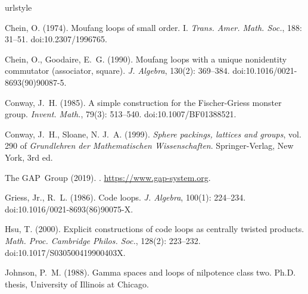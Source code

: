 \documentclass{article}
\theoremstyle{plain}
\theoremstyle{definition}
\begin{document}

\newpage

\begin{thebibliography}{10}
\expandafter\ifx\csname urlstyle\endcsname\relax
 \providecommand{\doi}[1]{doi:\discretionary{}{}{}#1}\else
 \providecommand{\doi}{doi:\discretionary{}{}{}\begingroup
  \urlstyle{rm}\Url}\fi

Chein, O. (1974).
\newblock Moufang loops of small order. {I}.
\newblock \emph{Trans. Amer. Math. Soc.}, 188: 31--51.
\newblock \doi{10.2307/1996765}.

Chein, O., Goodaire, E.~G. (1990).
\newblock Moufang loops with a unique nonidentity commutator (associator,
  square).
\newblock \emph{J. Algebra}, 130(2): 369--384.
\newblock \doi{10.1016/0021-8693(90)90087-5}.

Conway, J.~H. (1985).
\newblock A simple construction for the {F}ischer-{G}riess monster group.
\newblock \emph{Invent. Math.}, 79(3): 513--540.
\newblock \doi{10.1007/BF01388521}.

Conway, J.~H., Sloane, N. J.~A. (1999).
\newblock \emph{Sphere packings, lattices and groups}, vol. 290 of
  \emph{Grundlehren der Mathematischen Wissenschaften}.
\newblock Springer-Verlag, New York, 3rd ed.

The GAP~Group (2019).
. 
\newblock \url{https://www.gap-system.org}.

Griess, Jr., R.~L. (1986).
\newblock Code loops.
\newblock \emph{J. Algebra}, 100(1): 224--234.
\newblock \doi{10.1016/0021-8693(86)90075-X}.

Hsu, T. (2000).
\newblock Explicit constructions of code loops as centrally twisted products.
\newblock \emph{Math. Proc. Cambridge Philos. Soc.}, 128(2): 223--232.
\newblock \doi{10.1017/S030500419900403X}.

Johnson, P.~M. (1988).
\newblock Gamma spaces and loops of nilpotence class two.
\newblock Ph.D. thesis, University of Illinois at Chicago.



\end{thebibliography}
\end{document}
